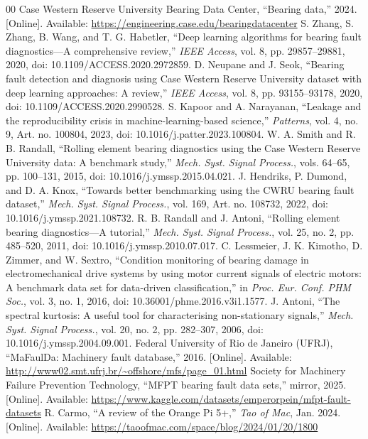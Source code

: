 \documentclass[conference,letterpaper]{IEEEtran}
\begin{document}
\begin{thebibliography}{00}
 Case Western Reserve University Bearing Data Center, ``Bearing data,'' 2024. [Online]. Available:
\url{https://engineering.case.edu/bearingdatacenter}
 S. Zhang, S. Zhang, B. Wang, and T. G. Habetler, ``Deep learning algorithms for bearing fault
diagnostics---A comprehensive review,'' \textit{IEEE Access}, vol. 8, pp. 29857--29881, 2020,
doi: 10.1109/ACCESS.2020.2972859.
 D. Neupane and J. Seok, ``Bearing fault detection and diagnosis using Case Western Reserve
University dataset with deep learning approaches: A review,'' \textit{IEEE Access}, vol. 8, pp. 93155--93178, 2020,
doi: 10.1109/ACCESS.2020.2990528.
 S. Kapoor and A. Narayanan, ``Leakage and the reproducibility crisis in machine-learning-based
science,'' \textit{Patterns}, vol. 4, no. 9, Art. no. 100804, 2023, doi: 10.1016/j.patter.2023.100804.
 W. A. Smith and R. B. Randall, ``Rolling element bearing diagnostics using the Case Western
Reserve University data: A benchmark study,'' \textit{Mech. Syst. Signal Process.}, vols. 64--65, pp. 100--131, 2015,
doi: 10.1016/j.ymssp.2015.04.021.
 J. Hendriks, P. Dumond, and D. A. Knox, ``Towards better benchmarking using the CWRU bearing
fault dataset,'' \textit{Mech. Syst. Signal Process.}, vol. 169, Art. no. 108732, 2022,
doi: 10.1016/j.ymssp.2021.108732.
 R. B. Randall and J. Antoni, ``Rolling element bearing diagnostics---A tutorial,''
\textit{Mech. Syst. Signal Process.}, vol. 25, no. 2, pp. 485--520, 2011, doi: 10.1016/j.ymssp.2010.07.017.
 C. Lessmeier, J. K. Kimotho, D. Zimmer, and W. Sextro, ``Condition monitoring of bearing
damage in electromechanical drive systems by using motor current signals of electric motors: A benchmark data set
for data-driven classification,'' in \textit{Proc. Eur. Conf. PHM Soc.}, vol. 3, no. 1, 2016,
doi: 10.36001/phme.2016.v3i1.1577.
 J. Antoni, ``The spectral kurtosis: A useful tool for characterising non-stationary
signals,'' \textit{Mech. Syst. Signal Process.}, vol. 20, no. 2, pp. 282--307, 2006, doi: 10.1016/j.ymssp.2004.09.001.
 Federal University of Rio de Janeiro (UFRJ), ``MaFaulDa: Machinery fault database,'' 2016.
[Online]. Available: \url{http://www02.smt.ufrj.br/~offshore/mfs/page_01.html}
 Society for Machinery Failure Prevention Technology, ``MFPT bearing fault data sets,'' mirror, 2025.
[Online]. Available: \url{https://www.kaggle.com/datasets/emperorpein/mfpt-fault-datasets}
 R. Carmo, ``A review of the Orange Pi 5+,'' \textit{Tao of Mac}, Jan. 2024. [Online]. Available:
\url{https://taoofmac.com/space/blog/2024/01/20/1800}
\end{thebibliography}
\end{document}
